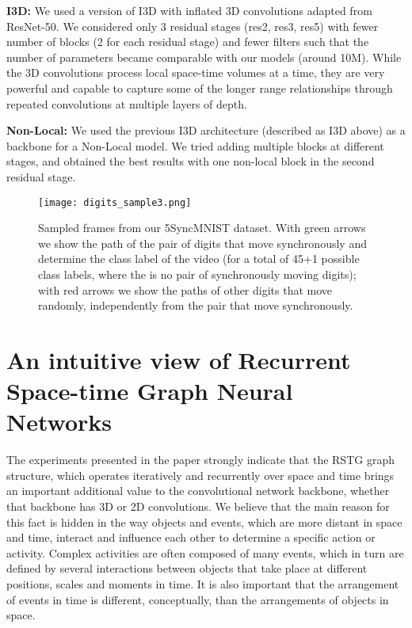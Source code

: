\documentclass{article}
\begin{document}
\textbf{I3D:}  We used a version of I3D \cite{carreira2017quo} with inflated 3D convolutions adapted from ResNet-50. We considered only 3 residual stages (res2, res3, res5) with fewer number of blocks (2 for each residual stage) and fewer filters such that the number of parameters became comparable with our models (around 10M). While the 3D convolutions process local space-time volumes at a time, they are very powerful and capable to capture some of the longer range relationships through repeated convolutions at multiple layers of depth.

\textbf{Non-Local:}  We used the previous I3D architecture (described as I3D above) as a backbone for a Non-Local\cite{wang2018non_local} model. We tried adding multiple blocks at different stages, and obtained the best results with one non-local block in the second residual stage.

\begin{figure}[t!]
\begin{center}
\centerline{\texttt{[image: digits\_sample3.png]}}
\caption{Sampled frames from our 5SyncMNIST dataset. With green arrows we show the path of the pair of digits that move synchronously and determine the class label of the video (for a total of 45+1 possible class labels, where the is no pair of synchronously moving digits); with red arrows we show the paths of other digits that move randomly, independently from the pair that move synchronously.}
\label{fig:main_graph_figure}
\end{center}
\end{figure}








\section{An intuitive view of Recurrent Space-time Graph Neural Networks}

The experiments presented in the paper strongly indicate that the RSTG graph structure, which operates iteratively and recurrently over space and time brings an important additional value to the convolutional network backbone, whether that backbone has 3D or 2D convolutions. We believe that the main reason for this fact is hidden in the way objects and events, which are more distant in space and time, interact and influence each other to determine a specific action or activity. Complex activities are often composed of many events, which in turn are defined by several interactions between objects that take place at different positions, scales and moments in time. It is also important that the arrangement of events in time is different, conceptually, than the arrangements of objects in space. 
\end{document}

